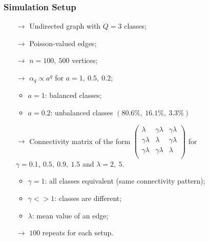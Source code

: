 \documentclass{beamer}
\begin{document}
\begin{frame}
  \frametitle{Simulation Setup}
  \begin{itemize}
  \item[\bf{$\rightarrow$}] Undirected graph with $Q=3$ classes;\medskip
    \pause
  \item[\bf{$\rightarrow$}] Poisson-valued edges;\medskip
    \pause
  \item[\bf{$\rightarrow$}] $n=100,\ 500$ vertices;\medskip
    \pause
  \item[\bf{$\rightarrow$}] $\alpha_q \propto a^q$ for $a=1,\ 0.5,\
    0.2$;
    \begin{itemize}
    \item $a=1$: balanced classes;
    \item $a=0.2$: unbalanced classes $(80.6\%,\ 16.1\%,\ 3.3\%)$
    \end{itemize}
    \pause
  \item[\bf{$\rightarrow$}] Connectivity matrix of the form
    $
    \left(
      \begin{array}{ccc}
        \lambda & \gamma \lambda & \gamma \lambda \\
        \gamma \lambda & \lambda & \gamma \lambda \\
        \gamma \lambda & \gamma \lambda & \lambda \\
      \end{array}
    \right)
    $
    for $\gamma = 0.1,\ 0.5,\ 0.9,\ 1.5$ and $\lambda = 2,\ 5$.
    \begin{itemize}
    \item $\gamma=1$: all classes equivalent (same connectivity pattern);
    \item $\gamma<>1$: classes are different;
    \item $\lambda$: mean value of an edge;
    \end{itemize}
    \item[\bf{$\rightarrow$}] $100$ repeats for each setup.
  \end{itemize}
\end{frame}
\end{document}

